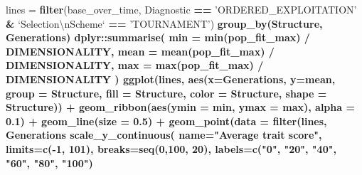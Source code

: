 \documentclass[]{book}
\newenvironment{Shaded}{\begin{snugshade}}{\end{snugshade}}
\newcommand{\CharTok}[1]{\textcolor[rgb]{0.31,0.60,0.02}{#1}}
\newcommand{\DataTypeTok}[1]{\textcolor[rgb]{0.13,0.29,0.53}{#1}}
\newcommand{\DecValTok}[1]{\textcolor[rgb]{0.00,0.00,0.81}{#1}}
\newcommand{\FloatTok}[1]{\textcolor[rgb]{0.00,0.00,0.81}{#1}}
\newcommand{\KeywordTok}[1]{\textcolor[rgb]{0.13,0.29,0.53}{\textbf{#1}}}
\newcommand{\NormalTok}[1]{#1}
\newcommand{\OperatorTok}[1]{\textcolor[rgb]{0.81,0.36,0.00}{\textbf{#1}}}
\newcommand{\StringTok}[1]{\textcolor[rgb]{0.31,0.60,0.02}{#1}}
\begin{document}
\begin{Shaded}
\begin{Highlighting}[]
\NormalTok{lines =}\StringTok{ }\KeywordTok{filter}\NormalTok{(base_over_time, Diagnostic }\OperatorTok{==}\StringTok{ 'ORDERED_EXPLOITATION'} \OperatorTok{&}\StringTok{ `}\DataTypeTok{Selection}\CharTok{\textbackslash{}n}\DataTypeTok{Scheme}\StringTok{`} \OperatorTok{==}\StringTok{ 'TOURNAMENT'}\NormalTok{) }\OperatorTok{%>%}
\StringTok{  }\KeywordTok{group_by}\NormalTok{(Structure, Generations) }\OperatorTok{%>%}
\StringTok{  }\NormalTok{dplyr}\OperatorTok{::}\KeywordTok{summarise}\NormalTok{(}
    \DataTypeTok{min =} \KeywordTok{min}\NormalTok{(pop_fit_max) }\OperatorTok{/}\StringTok{ }\NormalTok{DIMENSIONALITY,}
    \DataTypeTok{mean =} \KeywordTok{mean}\NormalTok{(pop_fit_max) }\OperatorTok{/}\StringTok{ }\NormalTok{DIMENSIONALITY,}
    \DataTypeTok{max =} \KeywordTok{max}\NormalTok{(pop_fit_max) }\OperatorTok{/}\StringTok{ }\NormalTok{DIMENSIONALITY}
\NormalTok{  )}
\KeywordTok{ggplot}\NormalTok{(lines, }\KeywordTok{aes}\NormalTok{(}\DataTypeTok{x=}\NormalTok{Generations, }\DataTypeTok{y=}\NormalTok{mean, }\DataTypeTok{group =}\NormalTok{ Structure, }\DataTypeTok{fill =}\NormalTok{ Structure, }\DataTypeTok{color =}\NormalTok{ Structure, }\DataTypeTok{shape =}\NormalTok{ Structure)) }\OperatorTok{+}
\StringTok{  }\KeywordTok{geom_ribbon}\NormalTok{(}\KeywordTok{aes}\NormalTok{(}\DataTypeTok{ymin =}\NormalTok{ min, }\DataTypeTok{ymax =}\NormalTok{ max), }\DataTypeTok{alpha =} \FloatTok{0.1}\NormalTok{) }\OperatorTok{+}
\StringTok{  }\KeywordTok{geom_line}\NormalTok{(}\DataTypeTok{size =} \FloatTok{0.5}\NormalTok{) }\OperatorTok{+}
\StringTok{  }\KeywordTok{geom_point}\NormalTok{(}\DataTypeTok{data =} \KeywordTok{filter}\NormalTok{(lines, Generations }\OperatorTok{%%}\StringTok{ }\DecValTok{2000} \OperatorTok{==}\StringTok{ }\DecValTok{0}\NormalTok{), }\DataTypeTok{size =} \FloatTok{2.5}\NormalTok{, }\DataTypeTok{stroke =} \FloatTok{2.0}\NormalTok{, }\DataTypeTok{alpha =} \FloatTok{1.0}\NormalTok{) }\OperatorTok{+}
\StringTok{  }\KeywordTok{scale_y_continuous}\NormalTok{(}
    \DataTypeTok{name=}\StringTok{"Average trait score"}\NormalTok{,}
    \DataTypeTok{limits=}\KeywordTok{c}\NormalTok{(}\OperatorTok{-}\DecValTok{1}\NormalTok{, }\DecValTok{101}\NormalTok{),}
    \DataTypeTok{breaks=}\KeywordTok{seq}\NormalTok{(}\DecValTok{0}\NormalTok{,}\DecValTok{100}\NormalTok{, }\DecValTok{20}\NormalTok{),}
    \DataTypeTok{labels=}\KeywordTok{c}\NormalTok{(}\StringTok{"0"}\NormalTok{, }\StringTok{"20"}\NormalTok{, }\StringTok{"40"}\NormalTok{, }\StringTok{"60"}\NormalTok{, }\StringTok{"80"}\NormalTok{, }\StringTok{"100"}\NormalTok{)}
}}}
\end{Highlighting}
\end{Shaded}
\end{document}
